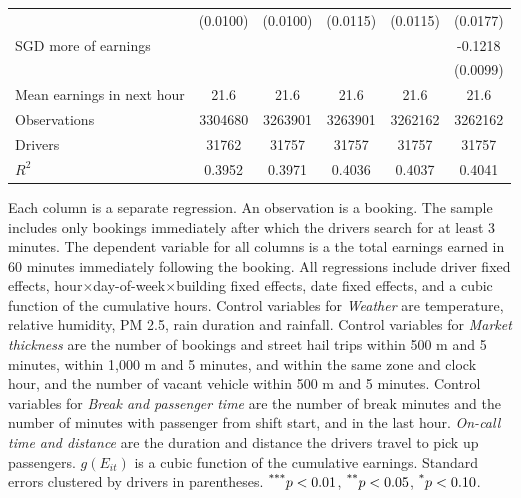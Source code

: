 \documentclass[reviewmode,AEJ]{AEA}
\begin{document}
\begin{table}[]
{\begin{tabularx}{\textwidth}{l@{\extracolsep{\fill}}*{5}{S[table-format = 0.4, table-space-text-pre={**}, table-space-text-post={-**}]}}
                &    (0.0100)         &    (0.0100)         &    (0.0115)         &    (0.0115)         &    (0.0177)         \\
     SGD more of earnings&                     &                     &                     &                     &     -0.1218\sym{***}         \\
                &                     &                     &                     &                     &    (0.0099)         \\
    \midrule
    Mean earnings in next hour&     \num{21.6}         &     \num{21.6}         &     \num{21.6}         &     \num{21.6}         &     \num{21.6}         \\
    Observations&\num{3304680}         &\num{3263901}         &\num{3263901}         &\num{3262162}         &\num{3262162}         \\
    Drivers     & \num{31762}         & \num{31757}         & \num{31757}         & \num{31757}         & \num{31757}         \\
    \(R^2\)     &      0.3952         &      0.3971         &      0.4036         &      0.4037         &      0.4041         \\
    \bottomrule
    \end{tabularx}
    }
	\begin{tablenotes}
	\small
        Each column is a separate regression. An observation is a booking. The sample includes only bookings immediately after which the drivers search for at least 3 minutes. The dependent variable for all columns is a the total earnings earned in 60 minutes immediately following the booking. All regressions include driver fixed effects, hour\(\times\)day-of-week\(\times\)building fixed effects, date fixed effects, and a cubic function of the cumulative hours. Control variables for \textit{Weather} are temperature, relative humidity, PM 2.5, rain duration and rainfall. Control variables for \textit{Market thickness} are the number of bookings and street hail trips within 500 m and 5 minutes, within 1,000 m and 5 minutes, and within the same zone and clock hour, and the number of vacant vehicle within 500 m and 5 minutes. Control variables for \textit{Break and passenger time} are the number of break minutes and the number of minutes with passenger from shift start, and in the last hour. \textit{On-call time and distance} are the duration and distance the drivers travel to pick up passengers. \(g(E_{it})\) is a cubic function of the cumulative earnings. Standard errors clustered by drivers in parentheses. $\textsuperscript{***}p < 0.01$, $\textsuperscript{**}p < 0.05$, $\textsuperscript{*}p < 0.10$. 
	\end{tablenotes}
\end{table}
\end{document}
